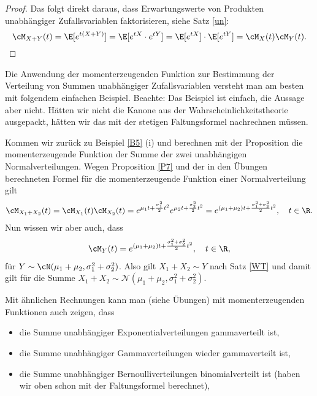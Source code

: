 \begin{proof} 
Das folgt direkt daraus, dass Erwartungswerte von Produkten unabh\"angiger Zufallsvariablen faktorisieren, siehe Satz \ref{un}:
	$$\cM_{X+Y}(t) = \E[e^{t(X+Y)}] = \E[e^{tX}\cdot e^{tY}] = \E[e^{tX}] \cdot \E[e^{tY}] = \cM_X(t)\cM_Y(t).$$
\end{proof}

Die Anwendung der momenterzeugenden Funktion zur Bestimmung der Verteilung von Summen unabh\"angiger Zufallsvariablen versteht man am besten mit folgendem einfachen Beispiel. Beachte: Das Beispiel ist einfach, die Aussage aber nicht. H\"atten wir nicht die Kanone aus der Wahrscheinlichkeitstheorie ausgepackt, h\"atten wir das mit der stetigen Faltungsformel nachrechnen m\"ussen. 

\begin{beispiel}
	Kommen wir zur\"uck zu Beispiel \ref{B5} (i) und berechnen mit der Proposition die momenterzeugende Funktion der Summe der zwei unabh\"angigen Normalverteilungen. Wegen Proposition \ref{P7} und der in den \"Ubungen berechneten Formel f\"ur die momenterzeugende Funktion einer Normalverteilung gilt
	\begin{gather*}
		\cM_{X_1+X_2}(t) = \cM_{X_1}(t)\cM_{X_2}(t) = e^{\mu_1 t + \frac{\sigma_1^2}{2}t^2} e^{\mu_2 t + \frac{\sigma_2^2}{2}t^2}=e^{(\mu_1+\mu_2)t + \frac{\sigma_1^2 + \sigma_2^2}{2}t^2},\quad t\in\R.
	\end{gather*}
	Nun wissen wir aber auch, dass
	\begin{align*}
		\cM_Y(t)=e^{(\mu_1+\mu_2)t + \frac{\sigma_1^2 + \sigma_2^2}{2}t^2}, \quad t\in\R,
	\end{align*} 
	 f\"ur $Y \sim \cN(\mu_1 + \mu_2, \sigma_1^2 + \sigma_2^2)$. Also gilt $X_1+X_2\sim Y$ nach Satz \ref{WT} und damit gilt f\"ur die Summe $X_1+X_2\sim \mathcal N(\mu_1+\mu_2,\sigma_1^2 + \sigma_2^2)$.
\end{beispiel}
Mit \"ahnlichen Rechnungen kann man (siehe \"Ubungen) mit momenterzeugenden Funktionen auch zeigen, dass
\begin{itemize}
	\item die Summe unabh\"angiger Exponentialverteilungen gammaverteilt ist,
	\item die Summe unabh\"angiger Gammaverteilungen wieder gammaverteilt ist,
	\item die Summe unabh\"angiger Bernoulliverteilungen binomialverteilt ist (haben wir oben schon mit der Faltungsformel berechnet),
\end{itemize}
